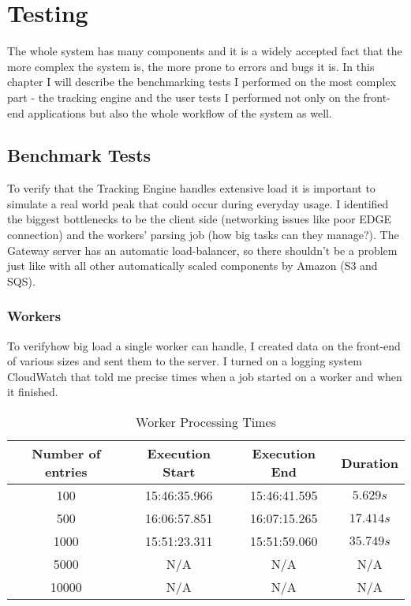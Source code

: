 \chapter{Testing}

The whole system has many components and it is a widely accepted fact that the more complex the system is, the more prone to errors and bugs it is. In this chapter I will describe the benchmarking tests I performed on the most complex part - the tracking engine and the user tests I performed not only on the front-end applications but also the whole workflow of the system as well.

\section{Benchmark Tests}

To verify that the Tracking Engine handles extensive load it is important to simulate a real world peak that could occur during everyday usage. I identified the biggest bottlenecks to be the client side (networking issues like poor EDGE connection) and the workers' parsing job (how big tasks can they manage?). The Gateway server has an automatic load-balancer, so there shouldn't be a problem just like with all other automatically scaled components by Amazon (S3 and SQS).

\subsection{Workers}

To verifyhow big load a single worker can handle, I created data on the front-end of various sizes and sent them to the server. I turned on a logging system CloudWatch that told me precise times when a job started on a worker and when it finished.

\begin{table}[!ht]
\begin{center}
\begin{tabular}{|c|c|c|c|}
\hline
\textbf{Number of entries} & \textbf{Execution Start} & \textbf{Execution End} & \textbf{Duration} \\
\hline
100 & 15:46:35.966 & 15:46:41.595 & $5.629s$ \\
\hline
500 & 16:06:57.851 & 16:07:15.265 & $17.414s$ \\
\hline
1000 & 15:51:23.311 & 15:51:59.060 & $35.749s$ \\
\hline
5000 & N/A & N/A & N/A \\
\hline
10000 & N/A & N/A & N/A \\
\hline
\end{tabular}
\end{center}
\caption{Worker Processing Times}
\label{tab:table_worker}
\end{table}


